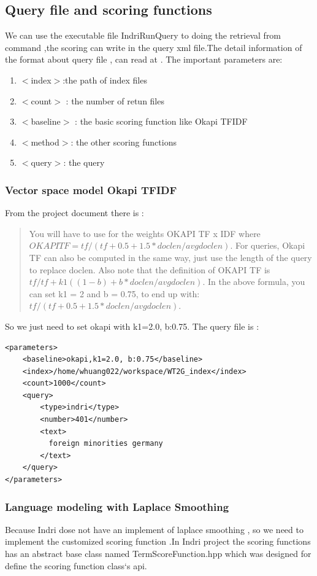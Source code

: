 \documentclass{article}
\begin{document}
\subsection{Query file and scoring functions}
We can use the executable file IndriRunQuery to doing the retrieval from command ,the scoring can write in the query xml file.The detail information of the format about query file , can read at \cite{ref4}.
The important parameters are:

\begin{enumerate}
  \item { $<$index$>$:the path of index files}
  \item { $<$count$>$ : the number of retun files}
  \item { $<$baseline$>$ : the basic scoring function like Okapi TFIDF }
  \item { $<$method$>$: the other scoring functions }
  \item { $<$query$>$: the query}
\end{enumerate}

\subsubsection{Vector space model Okapi TFIDF}
From the project document there is :
\begin{quotation}
  You will have to use for the weights OKAPI TF x IDF where $ OKAPI TF = tf/(tf + 0.5 + 1.5 * doclen / avgdoclen)$. For queries, Okapi TF can also be computed in the same way, just use the length of the query to replace doclen.
  Also note that the definition of OKAPI TF is$ tf / tf + k1((1 - b) + b * doclen / avgdoclen)$. In the above formula, you can set k1 = 2 and b = 0.75, to end up with:$ tf / (tf + 0.5 + 1.5 * doclen / avgdoclen).$
\end{quotation}
So we just need to set okapi with k1=2.0, b:0.75.
The query file is :

\lstset{language=XML}
\begin{lstlisting}[caption={okapi.xml}]
  <parameters>
	<baseline>okapi,k1=2.0, b:0.75</baseline>  
	<index>/home/whuang022/workspace/WT2G_index</index>
	<count>1000</count>
	<query>
		<type>indri</type>
		<number>401</number>
		<text>
		  foreign minorities germany
		</text>
	</query>
</parameters>
\end{lstlisting}
\subsubsection{Language modeling with Laplace Smoothing}
  Because Indri dose not have an implement of laplace smoothing , so we need to implement the
customized scoring function .In Indri project the scoring functions has an abstract base class named TermScoreFunction.hpp
which was designed for define the scoring function class`s api. 
\end{document}
